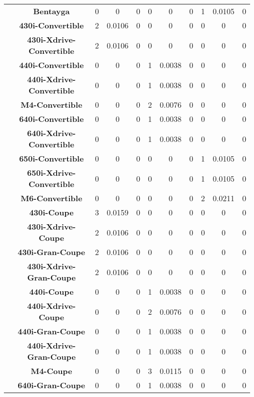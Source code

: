 \begin{center}
\begin{tabular}{|c|c||@{\hspace{1ex}}||c|c|c||@{\hspace{1ex}}||c|c|c||@{\hspace{1ex}}||c|c|c||@{\hspace{1ex}}||}
\cline{2-11}
  & {\bf Bentayga} & 0 & 0 & 0 & 0 & 0 & 0 & 1 & 0.0105 & 0 \\
\cline{2-11}
  & {\bf 430i-Convertible} & 2 & 0.0106 & 0 & 0 & 0 & 0 & 0 & 0 & 0 \\
\cline{2-11}
  & {\bf 430i-Xdrive-Convertible} & 2 & 0.0106 & 0 & 0 & 0 & 0 & 0 & 0 & 0 \\
\cline{2-11}
  & {\bf 440i-Convertible} & 0 & 0 & 0 & 1 & 0.0038 & 0 & 0 & 0 & 0 \\
\cline{2-11}
  & {\bf 440i-Xdrive-Convertible} & 0 & 0 & 0 & 1 & 0.0038 & 0 & 0 & 0 & 0 \\
\cline{2-11}
  & {\bf M4-Convertible} & 0 & 0 & 0 & 2 & 0.0076 & 0 & 0 & 0 & 0 \\
\cline{2-11}
  & {\bf 640i-Convertible} & 0 & 0 & 0 & 1 & 0.0038 & 0 & 0 & 0 & 0 \\
\cline{2-11}
  & {\bf 640i-Xdrive-Convertible} & 0 & 0 & 0 & 1 & 0.0038 & 0 & 0 & 0 & 0 \\
\cline{2-11}
  & {\bf 650i-Convertible} & 0 & 0 & 0 & 0 & 0 & 0 & 1 & 0.0105 & 0 \\
\cline{2-11}
  & {\bf 650i-Xdrive-Convertible} & 0 & 0 & 0 & 0 & 0 & 0 & 1 & 0.0105 & 0 \\
\cline{2-11}
  & {\bf M6-Convertible} & 0 & 0 & 0 & 0 & 0 & 0 & 2 & 0.0211 & 0 \\
\cline{2-11}
  & {\bf 430i-Coupe} & 3 & 0.0159 & 0 & 0 & 0 & 0 & 0 & 0 & 0 \\
\cline{2-11}
  & {\bf 430i-Xdrive-Coupe} & 2 & 0.0106 & 0 & 0 & 0 & 0 & 0 & 0 & 0 \\
\cline{2-11}
  & {\bf 430i-Gran-Coupe} & 2 & 0.0106 & 0 & 0 & 0 & 0 & 0 & 0 & 0 \\
\cline{2-11}
  & {\bf 430i-Xdrive-Gran-Coupe} & 2 & 0.0106 & 0 & 0 & 0 & 0 & 0 & 0 & 0 \\
\cline{2-11}
  & {\bf 440i-Coupe} & 0 & 0 & 0 & 1 & 0.0038 & 0 & 0 & 0 & 0 \\
\cline{2-11}
  & {\bf 440i-Xdrive-Coupe} & 0 & 0 & 0 & 2 & 0.0076 & 0 & 0 & 0 & 0 \\
\cline{2-11}
  & {\bf 440i-Gran-Coupe} & 0 & 0 & 0 & 1 & 0.0038 & 0 & 0 & 0 & 0 \\
\cline{2-11}
  & {\bf 440i-Xdrive-Gran-Coupe} & 0 & 0 & 0 & 1 & 0.0038 & 0 & 0 & 0 & 0 \\
\cline{2-11}
  & {\bf M4-Coupe} & 0 & 0 & 0 & 3 & 0.0115 & 0 & 0 & 0 & 0 \\
\cline{2-11}
  & {\bf 640i-Gran-Coupe} & 0 & 0 & 0 & 1 & 0.0038 & 0 & 0 & 0 & 0 \\

\end{tabular}
\end{center}
